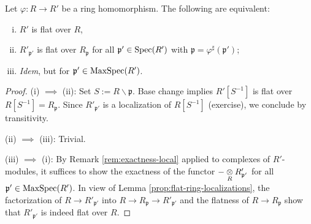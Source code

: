 \begin{proposition}\label{prop:flatness-localized}
	Let $\varphi: R \to R'$ be a ring homomorphism. The following are equivalent:
	\begin{enumerate}[(i)]
		\item $R'$ is flat over $R$,
		\item $R'_{\mathfrak{p}'}$ is flat over $R_{\mathfrak{p}}$ for all $\mathfrak{p}' \in \operatorname{Spec}(R')$ with $\mathfrak{p} = \varphi^\sharp(\mathfrak{p}')$;
		\item \emph{Idem}, but for $\mathfrak{p}' \in \operatorname{MaxSpec}(R')$.
	\end{enumerate}
\end{proposition}
\begin{proof}
	(i) $\implies$ (ii): Set $S := R \smallsetminus \mathfrak{p}$. Base change implies $R'[S^{-1}]$ is flat over $R[S^{-1}] = R_{\mathfrak{p}}$. Since $R'_{\mathfrak{p}'}$ is a localization of $R[S^{-1}]$ (exercise), we conclude by transitivity.
	
	(ii) $\implies$ (iii): Trivial.
	
	(iii) $\implies$ (i): By Remark \ref{rem:exactness-local} applied to complexes of $R'$-modules, it suffices to show the exactness of the functor $- \underset{R}{\otimes} R'_{\mathfrak{p}'}$ for all $\mathfrak{p}' \in \operatorname{MaxSpec}(R')$. In view of Lemma \ref{prop:flat-ring-localizations}, the factorization of $R \to R'_{\mathfrak{p}'}$ into $R \to R_{\mathfrak{p}} \to R'_{\mathfrak{p}'}$ and the flatness of $R \to R_{\mathfrak{p}}$ show that $R'_{\mathfrak{p}'}$ is indeed flat over $R$.
\end{proof}

